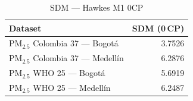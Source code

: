 \begin{table}[htbp]
\centering
\caption{SDM --- Hawkes M1 0CP}
\label{tab:hawkes_sdm_0cp}
\begin{tabular}{lr}
\toprule
Dataset & SDM (0\,CP) \\
\midrule
PM$_{2.5}$ Colombia 37 --- Bogot\'{a} & 3.7526 \\
PM$_{2.5}$ Colombia 37 --- Medell\'{i}n & 6.2876 \\
PM$_{2.5}$ WHO 25 --- Bogot\'{a} & 5.6919 \\
PM$_{2.5}$ WHO 25 --- Medell\'{i}n & 6.2487 \\
\bottomrule
\end{tabular}
\end{table}
